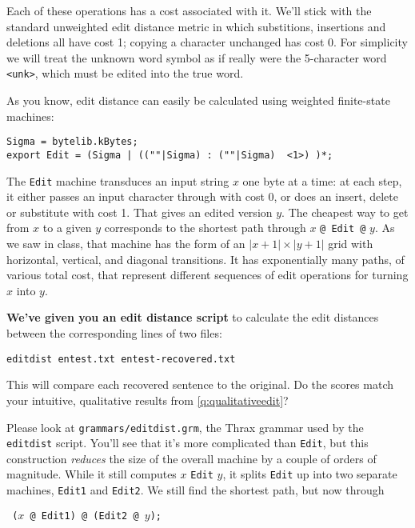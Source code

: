 \documentclass[11pt]{article}
\begin{document}
\begin{enumerate}[resume]
\begin{enumerate}[resume]
    Each of these operations has a cost associated with it.  We'll
    stick with the standard unweighted edit distance metric in which
    substitions, insertions and deletions all have cost 1; copying a
    character unchanged has cost 0.  For simplicity we will treat the
    unknown word symbol as if really were the 5-character word {\tt
      <unk>}, which must be edited into the true word.

    As you know, edit distance can easily be calculated using weighted
    finite-state machines:

\begin{verbatim}
Sigma = bytelib.kBytes;
export Edit = (Sigma | ((""|Sigma) : (""|Sigma)  <1>) )*;
\end{verbatim}
    The {\tt Edit} machine transduces an input string $x$ one byte at
    a time: at each step, it either passes an input character through
    with cost 0, or does an insert, delete or substitute with cost 1.
    That gives an edited version $y$.  The cheapest way to get from
    $x$ to a given $y$ corresponds to the shortest path through $x$
    \verb/@ Edit @/ $y$.  As we saw in class, that machine has the
    form of an $|x+1| \times |y+1|$ grid with horizontal, vertical,
    and diagonal transitions.  It has exponentially many paths, of
    various total cost, that represent different sequences of edit
    operations for turning $x$ into $y$.

    {\bf We've given you an edit distance script} to calculate the
    edit distances between the corresponding lines of two files:

\begin{verbatim}
editdist entest.txt entest-recovered.txt
\end{verbatim}

    This will compare each recovered sentence to the original.  Do the
    scores match your intuitive, qualitative results from
    \ref{q:qualitativeedit}?

    Please look at \texttt{grammars/editdist.grm}, the Thrax grammar
    used by the {\tt editdist} script.  You'll see that it's more
    complicated than \verb/Edit/, but this construction \textit{reduces}
    the size of the overall machine by a couple of orders of
    magnitude.  While it still computes $x$ \verb/Edit/ $y$, it splits
    \verb/Edit/ up into two separate machines, \verb/Edit1/ and
    \verb/Edit2/. We still find the shortest path, but now through

    \begin{center}
      {\tt
        ($x$ \verb/@/ Edit1) \verb/@/ (Edit2 \verb/@/ $y$);
      }
    \end{center}


\end{enumerate}
\end{enumerate}
\end{document}
